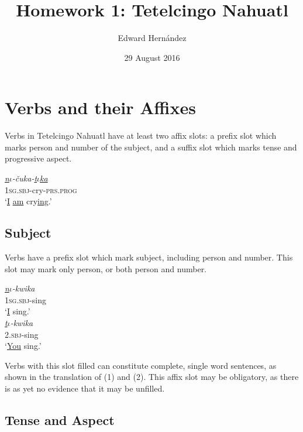 \documentclass[doc,12pt]{apa6}
\begin{document}
\title{Homework 1: Tetelcingo Nahuatl}
\author{Edward Hern\'{a}ndez}
\date{29 August 2016}
\maketitle

\setcounter{secnumdepth}{3}

\section{Verbs and their Affixes}

Verbs in Tetelcingo Nahuatl have at least two affix slots: a prefix slot which
marks person and number of the subject, and a suffix slot which marks tense and
progressive aspect.

\begin{exe}
	\ex 
	\gll \textit{\underline{n$\iota$}-\v{c}uka-\underline{t$\iota$ka}} \\
	\textsc{1sg.sbj}-cry-\textsc{prs.prog} \\
	\trans `\underline{I} \underline{am} cry\underline{ing}.'
\end{exe}

\subsection{Subject}

Verbs have a prefix slot which mark subject, including person and number. This
slot may mark only person, or both person and number.

\begin{exe}
	\ex 
	\gll \textit{\underline{n$\iota$}-kwika} \\
	\textsc{1sg.sbj}-sing \\
	\trans `\underline{I} sing.' \\
	\ex 
	\gll \textit{\underline{t$\iota$}-kwika} \\
	\textsc{2.sbj}-sing \\
	\trans `\underline{You} sing.'
\end{exe}

Verbs with this slot filled can constitute complete, single word sentences, as
shown in the translation of (1) and (2). This affix slot may be obligatory, as
there is as yet no evidence that it may be unfilled.

\subsection{Tense and Aspect}
\end{document}
